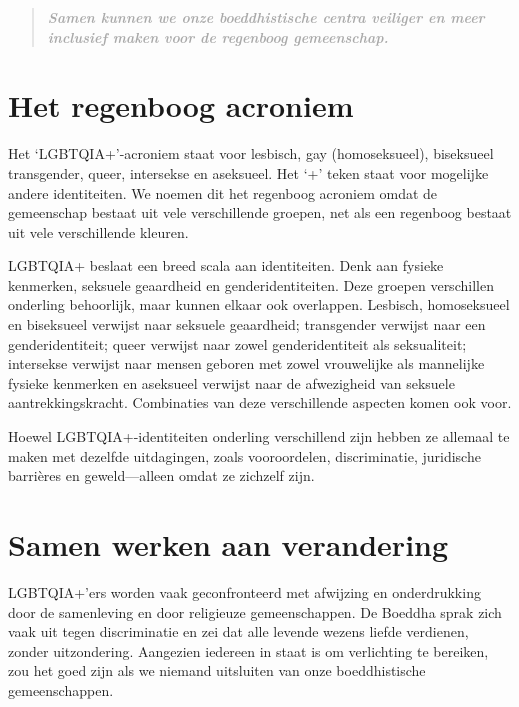 \documentclass[12pt,openany]{book}
\begin{document}
\begin{quote}
\textit{\large \textbf{\textcolor{darkgray}{Samen kunnen we onze boeddhistische centra veiliger en meer inclusief maken voor de regenboog gemeenschap.}}}
\end{quote}

\section*{Het regenboog acroniem}

Het `LGBTQIA+'-acroniem staat voor lesbisch, gay (homoseksueel), biseksueel transgender, queer, intersekse en aseksueel. Het `+' teken staat voor mogelijke andere identiteiten. We noemen dit het regenboog acroniem omdat de gemeenschap bestaat uit vele verschillende groepen, net als een regenboog bestaat uit vele verschillende kleuren. 

LGBTQIA+ beslaat een breed scala aan identiteiten. Denk aan fysieke kenmerken, seksuele geaardheid en genderidentiteiten. Deze groepen verschillen onderling behoorlijk, maar kunnen elkaar ook overlappen. Lesbisch, homoseksueel en biseksueel verwijst naar seksuele geaardheid; transgender verwijst naar een genderidentiteit; queer verwijst naar zowel genderidentiteit als seksualiteit; intersekse verwijst naar mensen geboren met zowel vrouwelijke als mannelijke fysieke kenmerken en aseksueel verwijst naar de afwezigheid van seksuele aantrekkingskracht. Combinaties van deze verschillende aspecten komen ook voor. 

Hoewel LGBTQIA+-identiteiten onderling verschillend zijn hebben ze allemaal te maken met dezelfde uitdagingen, zoals vooroordelen, discriminatie, juridische barrières en geweld—alleen omdat ze zichzelf zijn.

\section*{Samen werken aan verandering}

LGBTQIA+'ers worden vaak geconfronteerd met afwijzing en onderdrukking door de samenleving en door religieuze gemeenschappen. De Boeddha  sprak zich vaak uit tegen discriminatie en zei dat alle levende wezens liefde verdienen, zonder uitzondering. Aangezien iedereen in staat is om verlichting te bereiken, zou het goed zijn als we niemand uitsluiten van onze boeddhistische gemeenschappen.  
\end{document}
